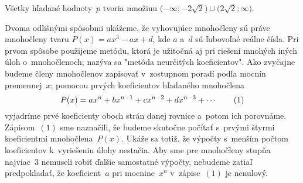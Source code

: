 {\odpoved
Všetky hľadané hodnoty~$p$ tvoria množinu
$\bigl({-\infty};{-2}\sqrt2\bigr)\cup\bigl(2\sqrt2;\infty\bigr)$.}

{%
Dvoma odlišnými spôsobmi ukážeme, že vyhovujúce
mnohočleny sú práve mnohočleny tvaru $P(x)=ax^3-ax+d$, kde $a$
a~$d$ sú ľubovoľné reálne čísla. Pri prvom spôsobe použijeme
metódu, ktorá je užitočná aj pri riešení mnohých iných úloh
o~mnohočlenoch; nazýva sa "metóda neurčitých koeficientov".
Ako zvyčajne budeme členy mnohočlenov zapisovať v~zostupnom
poradí podľa mocnín premennej~$x$; pomocou prvých koeficientov
hľadaného mnohočlena
$$
P(x)=ax^n+bx^{n-1}+cx^{n-2}+dx^{n-3}+\cdots
\tag1
$$
vyjadríme prvé koeficienty oboch strán danej rovnice a~potom ich
porovnáme. Zápisom~$(1)$ sme naznačili, že budeme skutočne počítať
s~prvými štyrmi koeficientmi mnohočlena~$P(x)$. Ukáže sa
totiž, že výpočty s~menším počtom koeficientov k~vyriešeniu
úlohy nestačia. Aby sme pre mnohočleny stupňa najviac~$3$ nemuseli
robiť ďalšie samostatné výpočty, nebudeme zatiaľ
predpokladať, že koeficient~$a$ pri mocnine~$x^n$ v~zápise~$(1)$ je
nenulový.

}
